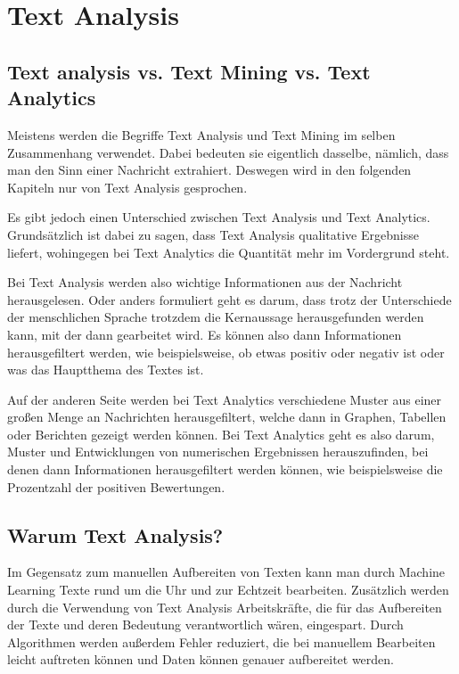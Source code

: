 \section{Text Analysis}

\subsection{Text analysis vs. Text Mining vs. Text Analytics}

Meistens werden die Begriffe Text Analysis und Text Mining im selben Zusammenhang verwendet.
Dabei bedeuten sie eigentlich dasselbe, nämlich, dass man den Sinn einer Nachricht extrahiert.
Deswegen wird in den folgenden Kapiteln nur von Text Analysis gesprochen.

Es gibt jedoch einen Unterschied zwischen Text Analysis und Text Analytics.
Grundsätzlich ist dabei zu sagen, dass Text Analysis qualitative Ergebnisse liefert, wohingegen bei Text Analytics die Quantität mehr im Vordergrund steht.\cite{textAnalysisMonkeylearn, machineLearningTextAnalysis}

Bei Text Analysis werden also wichtige Informationen aus der Nachricht herausgelesen.
Oder anders formuliert geht es darum, dass trotz der Unterschiede der menschlichen Sprache trotzdem die Kernaussage herausgefunden werden kann, mit der dann gearbeitet wird.
Es können also dann Informationen herausgefiltert werden, wie beispielsweise, ob etwas positiv oder negativ ist oder was das Hauptthema des Textes ist.\cite{textAnalysisMonkeylearn, machineLearningTextAnalysis}

Auf der anderen Seite werden bei Text Analytics verschiedene Muster aus einer großen Menge an Nachrichten herausgefiltert, welche dann in Graphen, Tabellen oder Berichten gezeigt werden können.
Bei Text Analytics geht es also darum, Muster und Entwicklungen von numerischen Ergebnissen herauszufinden, bei denen dann Informationen herausgefiltert werden können, wie beispielsweise die Prozentzahl der positiven Bewertungen.\cite{textAnalysisMonkeylearn, machineLearningTextAnalysis}

\subsection{Warum Text Analysis?}

Im Gegensatz zum manuellen Aufbereiten von Texten kann man durch Machine Learning Texte rund um die Uhr und zur Echtzeit bearbeiten.
Zusätzlich werden durch die Verwendung von Text Analysis Arbeitskräfte, die für das Aufbereiten der Texte und deren Bedeutung verantwortlich wären, eingespart.
Durch Algorithmen werden außerdem Fehler reduziert, die bei manuellem Bearbeiten leicht auftreten können und Daten können genauer aufbereitet werden.\cite{textAnalysisMonkeylearn}

